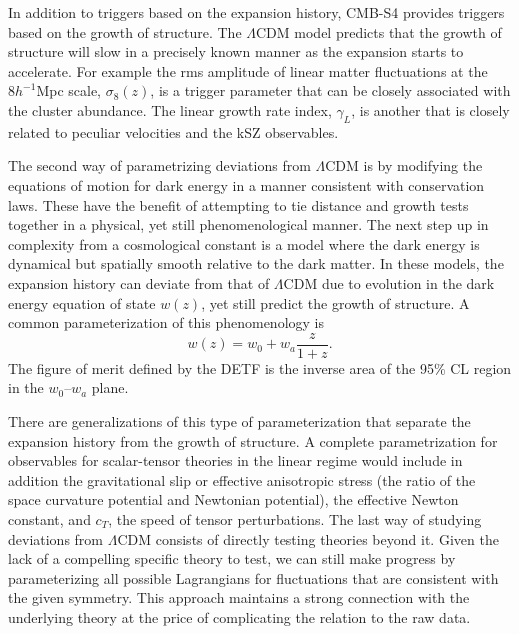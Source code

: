 In addition to triggers based on the expansion history, CMB-S4 provides triggers based
on the growth of structure.  The $\Lambda$CDM model predicts that the growth of structure
will slow in a precisely known manner as the expansion starts to accelerate.   
For example the rms amplitude of linear matter fluctuations at the $8 h^{-1}$Mpc
scale, $\sigma_8(z)$, is a trigger parameter that can be closely associated with the 
cluster abundance.   The linear growth rate index, $\gamma_L$, is another that is closely related
to peculiar velocities and the kSZ observables.   

The second way of parametrizing deviations from $\Lambda$CDM is by modifying the equations of motion for dark energy in a manner consistent with conservation laws.   These have the benefit of attempting to tie distance and growth
tests together in a physical, yet still phenomenological manner.    The next step up in
complexity from a cosmological constant is a model where the dark energy is dynamical
but spatially smooth relative to the dark matter.   In these models, the expansion history
can deviate from that of $\Lambda$CDM due to evolution in  the dark energy
equation of state $w(z)$, yet still predict the growth of structure.   A common parameterization
of this phenomenology is
\begin{equation}
w(z) = w_0 + w_a \frac{z}{1+z}.
\end{equation}
The figure of merit defined by the DETF is the inverse area of the
95\% CL region in the $w_0$--$w_a$ plane.  

There are generalizations of this type of parameterization that separate the expansion history from 
the growth of structure.   
A complete parametrization for observables for scalar-tensor theories in the linear regime would include in addition
the gravitational slip or effective anisotropic stress  (the ratio of the space curvature potential and Newtonian potential),  the effective Newton constant, and  $c_T$, the
speed of tensor perturbations. 
%
The last way of studying deviations from $\Lambda$CDM consists of directly testing theories beyond it.  Given the lack of a compelling specific theory to test, we can still make progress
by parameterizing all possible Lagrangians for fluctuations that are consistent with the
given symmetry.
 This approach maintains a strong connection with the underlying theory at the price of
complicating the relation to the raw data.  

